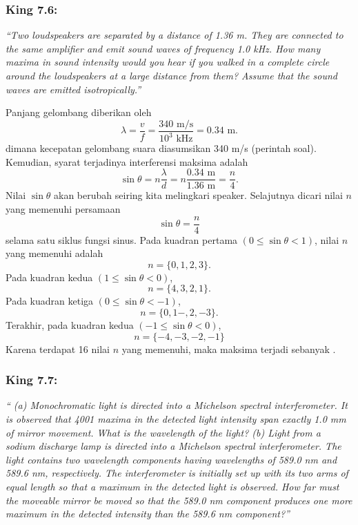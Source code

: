 \documentclass[../../../main.tex]{subfiles}
\begin{document}
\subsubsection{King 7.6:} \emph{\enquote{Two loudspeakers are separated by a distance of 1.36 m. They are connected to the same ampliﬁer and emit sound waves of frequency 1.0 kHz. How many maxima in sound intensity would you hear if you walked in a complete circle around the loudspeakers at a large distance from them? Assume that the sound waves are emitted isotropically.}}

Panjang gelombang diberikan oleh 
\begin{equation*}
  \lambda=\frac{v}{f}=\frac{340\text{ m/s}}{10^3\text{ kHz}}=0.34 \text{ m}.
\end{equation*}
dimana kecepatan gelombang suara diasumsikan 340 m/s (perintah soal). Kemudian, syarat terjadinya interferensi maksima adalah 
\begin{equation*}
  \sin \theta =n\frac{\lambda}{d}=n\frac{0.34 \text{ m}}{1.36 \text{ m}}=\frac{n}{4}.
\end{equation*}
Nilai $\sin \theta$ akan berubah seiring kita melingkari speaker. Selajutnya dicari nilai $n$ yang memenuhi persamaan
\begin{equation*}
  \sin \theta =\frac{n}{4}
\end{equation*}
selama satu siklus fungsi sinus. Pada kuadran pertama $(0\leq \sin \theta<1)$, nilai $n$ yang memenuhi adalah 
\begin{equation*}
  n=\{0,1,2,3\}.
\end{equation*}
Pada kuadran kedua $(1\leq \sin \theta<0)$,
\begin{equation*}
  n=\{4,3,2,1\}.
\end{equation*}
Pada kuadran ketiga $(0\leq \sin \theta<-1)$,
\begin{equation*}
  n=\{0,1-,2,-3\}.
\end{equation*}
Terakhir, pada kuadran kedua $(-1\leq \sin \theta<0)$,
\begin{equation*}
  n=\{-4,-3,-2,-1\}
\end{equation*}
Karena terdapat 16 nilai $n$ yang memenuhi, maka maksima terjadi sebanyak .
\subsubsection{King 7.7:} \emph{\enquote{ (a) Monochromatic light is directed into a Michelson spectral interferometer. It is observed that 4001 maxima in the detected light intensity span exactly 1.0 mm of mirror movement. What is the wavelength of the light? (b) Light from a sodium discharge lamp is directed into a Michelson spectral interferometer. The light contains two wavelength components having wavelengths of 589.0 nm and 589.6 nm, respectively. The interferometer is initially set up with its two arms of equal length so that a maximum in the detected light is observed. How far must the moveable mirror be moved so that the 589.0 nm component produces one more maximum in the detected intensity than the 589.6 nm component?}}
\end{document}
